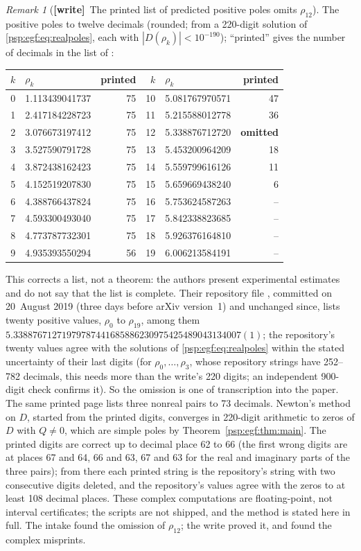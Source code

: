 \documentclass[11pt,letterpaper]{article}
\numberwithin{equation}{section}
\theoremstyle{remark}\newtheorem{remark}[theorem]{Remark}
\newcommand{\wtag}{\textup{\textbf{[write]}}}
\begin{document}
\begin{remark}[\wtag\ The printed list of predicted positive poles omits $\rho_{12}$]
The positive poles to twelve decimals (rounded; from a 220-digit solution of \eqref{psp:egf:eq:realpoles}, each with $|D(\rho_k)|<10^{-190}$); ``printed'' gives the number of decimals in the list of \cite{cgp}:
\begin{center}
\small
\begin{tabular}{@{}r l r @{\qquad} r l r@{}}
\toprule
$k$ & $\rho_k$ & printed & $k$ & $\rho_k$ & printed\\
\midrule
0 & 1.113439041737 & 75 & 10 & 5.081767970571 & 47\\
1 & 2.417184228723 & 75 & 11 & 5.215588012778 & 36\\
2 & 3.076673197412 & 75 & 12 & 5.338876712720 & \textbf{omitted}\\
3 & 3.527590791728 & 75 & 13 & 5.453200964209 & 18\\
4 & 3.872438162423 & 75 & 14 & 5.559799616126 & 11\\
5 & 4.152519207830 & 75 & 15 & 5.659669438240 & 6\\
6 & 4.388766437824 & 75 & 16 & 5.753624587263 & --\\
7 & 4.593300493040 & 75 & 17 & 5.842338823685 & --\\
8 & 4.773787732301 & 75 & 18 & 5.926376164810 & --\\
9 & 4.935393550294 & 56 & 19 & 6.006213584191 & --\\
\bottomrule
\end{tabular}
\end{center}
This corrects a list, not a theorem: the authors present experimental estimates and do not say that the list is complete. Their repository file \cite{repo}, committed on 20~August 2019 (three days before arXiv version~1) and unchanged since, lists twenty positive values, $\rho_0$ to $\rho_{19}$, among them $5.33887671271979787441685886230975425489043134007(1)$; the repository's twenty values agree with the solutions of \eqref{psp:egf:eq:realpoles} within the stated uncertainty of their last digits (for $\rho_0,\dots,\rho_3$, whose repository strings have 252--782 decimals, this needs more than the write's 220 digits; an independent 900-digit check confirms it). So the omission is one of transcription into the paper. The same printed page lists three nonreal pairs to 73 decimals. Newton's method on $D$, started from the printed digits, converges in 220-digit arithmetic to zeros of $D$ with $Q\ne0$, which are simple poles by Theorem~\ref{psp:egf:thm:main}. The printed digits are correct up to decimal place 62 to 66 (the first wrong digits are at places 67 and 64, 66 and 63, 67 and 63 for the real and imaginary parts of the three pairs); from there each printed string is the repository's string with two consecutive digits deleted, and the repository's values agree with the zeros to at least 108 decimal places. These complex computations are floating-point, not interval certificates; the scripts are not shipped, and the method is stated here in full. The intake found the omission of $\rho_{12}$; the write proved it, and found the complex misprints.
\end{remark}
\end{document}
